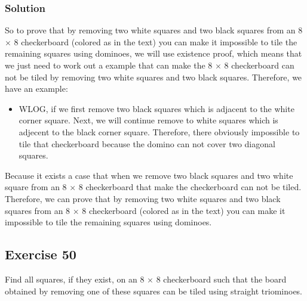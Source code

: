 \documentclass{article}
\begin{document}
\subsubsection*{Solution}
\begin{center}
\end{center}
So to prove that by removing two white squares and two black squares from an 
8 \(\times\) 8 checkerboard (colored as in the text) you can make it 
impossible to tile the remaining squares using dominoes, we will use existence
proof, which means that we just need to work out a example that can make
the 8 \(\times\) 8 checkerboard can not be tiled by removing two white squares and
two black squares. Therefore, we have an example:
\begin{itemize}
    \item WLOG, if we first remove two black squares which is adjacent to the white
    corner square. Next, we will continue remove to white squares which is adjecent to
    the black corner square. Therefore, there obviously impossible to tile that checkerboard
    because the domino can not cover two diagonal squares.
\end{itemize}
Because it exists a case that when we remove two black squares and two white square
from an 8 \(\times\) 8 checkerboard that make the checkerboard can not be tiled.
Therefore, we can prove that by removing two white squares and two black squares from an 
8 \(\times\) 8 checkerboard (colored as in the text) you can make it 
impossible to tile the remaining squares using dominoes.
\subsection*{Exercise 50}
Find all squares, if they exist, on an 8 \(\times\) 8 checkerboard such that 
the board obtained by removing one of these squares can be tiled using 
straight triominoes.
\clearpage
\end{document}

